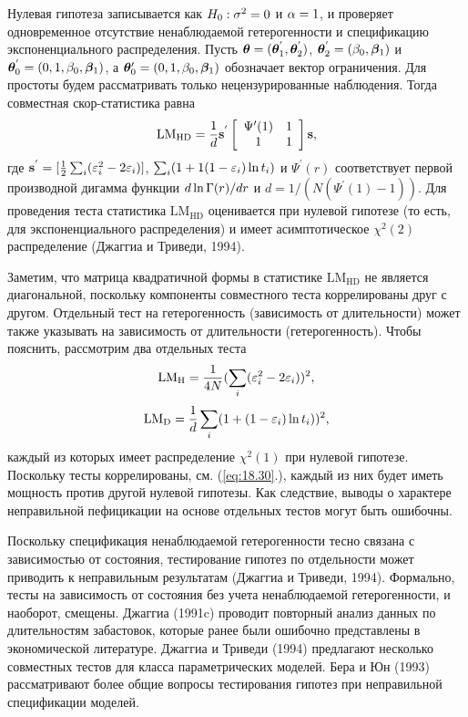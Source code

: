 Нулевая гипотеза записывается как $H_0: \sigma^2 = 0$ и $\alpha = 1$, и проверяет одновременное отсутствие ненаблюдаемой гетерогенности и спецификацию экспоненциального распределения. Пусть $\bm{\theta} = (\bm{\theta}^{'}_1, \bm{\theta}^{'}_2)$, $\bm{\theta}^{'}_2 = (\beta_0, \bm{\beta}_1)$ и $\bm{\theta}^{'}_0 = (0,1,\beta_0,\bm{\beta}_1)$, а $\bm{\theta}'_0 = (0, 1, \beta_0, \bm{\beta}_1)$ обозначает вектор ограничения. Для простоты будем рассматривать только нецензурированные наблюдения. Тогда совместная скор-статистика равна
    \begin{align}
        \label{eq:18.30}
        \mathrm{LM}_{\mathrm{HD}} = \frac{1}{d}\mathbf{s}^{'}\left[ \begin{array}{cc}
        \Psi'(1) & 1 \\
        1        & 1
        \end{array} \right] \mathbf{s},
    \end{align}
где $\mathbf{s}^{'} = [\frac{1}{2}\sum_i(\varepsilon^{2}_{i} - 2\varepsilon_i)]$, $\sum_i(1+1(1-\varepsilon_i)\ln t_i)$ и $\Psi^{'}(r)$ соответствует первой производной дигамма функции $d\ln\Gamma(r)/dr$ и $d = 1/(N(\Psi^{'}(1) - 1))$. Для проведения теста статистика $\mathrm{LM}_{\mathrm{HD}}$ оценивается при нулевой гипотезе (то есть, для экспоненциального распределения) и имеет асимптотическое $\chi^2(2)$ распределение (Джаггиа и Триведи, 1994).

Заметим, что матрица квадратичной формы в статистике $\mathrm{LM}_{\mathrm{HD}}$ не является диагональной, поскольку компоненты совместного теста коррелированы друг с другом. Отдельный тест на гетерогенность (зависимость от длительности) может также указывать на зависимость от длительности (гетерогенность). %
Чтобы пояснить, рассмотрим два отдельных теста
    \begin{align}
        \label{eq:18.31}
        \mathrm{LM}_{\mathrm{H}} = \frac{1}{4N}(\sum_i(\varepsilon^{2}_{i} - 2\varepsilon_i))^2,
    \end{align}
    \begin{align}
        \label{eq:18.32}
        \mathrm{LM}_{\mathrm{D}} = \frac{1}{d}\sum_i(1 + (1-\varepsilon_i)\ln t_i))^2,
    \end{align}
каждый из которых имеет распределение $\chi^2(1)$ при нулевой гипотезе. Поскольку тесты коррелированы, см. (\ref{eq:18.30}.), каждый из них будет иметь мощность против другой нулевой гипотезы. Как следствие, выводы о характере неправильной пефицикации на основе отдельных тестов могут быть ошибочны.

Поскольку спецификация ненаблюдаемой гетерогенности тесно связана с зависимостью от состояния, тестирование гипотез по отдельности может приводить к неправильным результатам (Джаггиа и Триведи, 1994). Формально, тесты на зависимость от состояния без учета ненаблюдаемой гетерогенности, и наоборот, смещены. Джаггиа (1991c) проводит повторный анализ данных по длительностям забастовок, которые ранее были ошибочно представлены в экономической литературе. Джаггиа и Триведи (1994) предлагают несколько совместных тестов для класса параметрических моделей. Бера и Юн (1993) рассматривают более общие вопросы тестирования гипотез при неправильной спецификации моделей.

